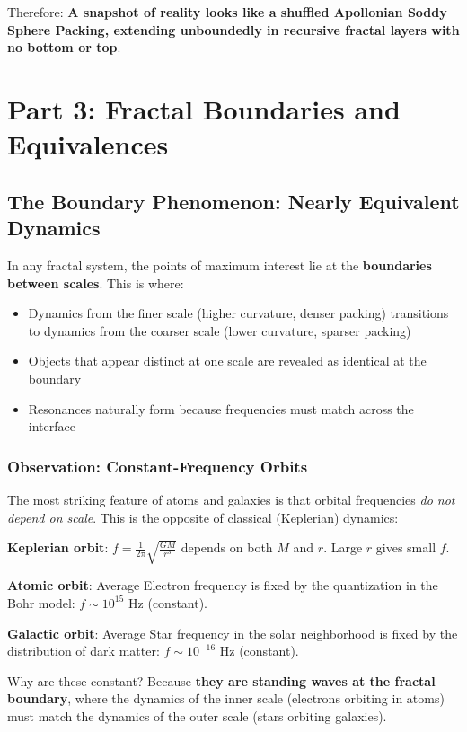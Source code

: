 \documentclass[11pt,a4paper]{article}
\begin{document}
Therefore: \textbf{A snapshot of reality looks like a shuffled  Apollonian Soddy Sphere Packing, extending unboundedly in recursive fractal layers with no bottom or top}.

\section{Part 3: Fractal Boundaries and Equivalences}

\subsection{The Boundary Phenomenon: Nearly Equivalent Dynamics}

In any fractal system, the points of maximum interest lie at the \textbf{boundaries between scales}. This is where:

\begin{itemize}
\item Dynamics from the finer scale (higher curvature, denser packing) transitions to dynamics from the coarser scale (lower curvature, sparser packing)
\item Objects that appear distinct at one scale are revealed as identical at the boundary
\item Resonances naturally form because frequencies must match across the interface
\end{itemize}

\subsubsection{Observation: Constant-Frequency Orbits}

The most striking feature of atoms and galaxies is that orbital frequencies \textit{do not depend on scale}. This is the opposite of classical (Keplerian) dynamics:

\textbf{Keplerian orbit}: $f = \frac{1}{2\pi}\sqrt{\frac{GM}{r^3}}$ depends on both $M$ and $r$. Large $r$ gives small $f$.

\textbf{Atomic orbit}: Average Electron frequency is fixed by the quantization in the Bohr model: $f \sim 10^{15}$ Hz (constant).

\textbf{Galactic orbit}: Average Star frequency in the solar neighborhood is fixed by the distribution of dark matter: $f \sim 10^{-16}$ Hz (constant).

Why are these constant? Because \textbf{they are standing waves at the fractal boundary}, where the dynamics of the inner scale (electrons orbiting in atoms) must match the dynamics of the outer scale (stars orbiting galaxies).
\end{document}
